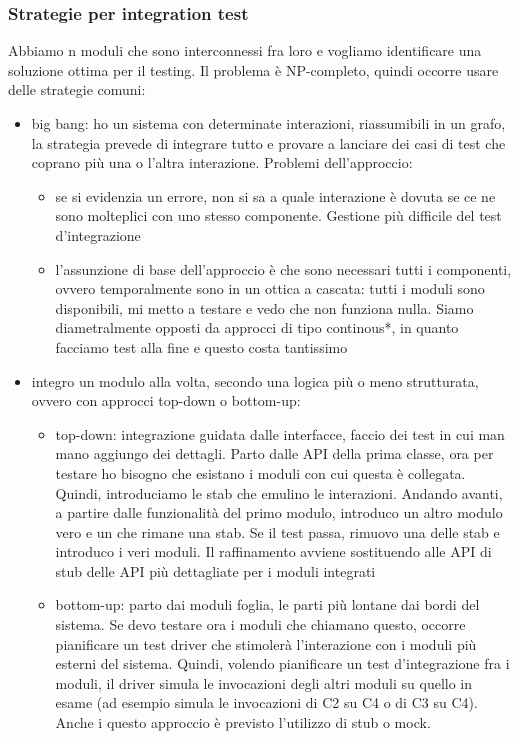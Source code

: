 \documentclass{article}
\begin{document}
\subsubsection{Strategie per integration test}
Abbiamo n moduli che sono interconnessi fra loro e vogliamo identificare una soluzione ottima per il testing. Il problema è NP-completo, quindi occorre usare delle strategie comuni:
\begin{itemize}
\item big bang: ho un sistema con determinate interazioni, riassumibili in un grafo, la strategia prevede di integrare tutto e provare a lanciare dei casi di test che coprano più una o l'altra interazione. Problemi dell'approccio:
\begin{itemize}
\item se si evidenzia un errore, non si sa a quale interazione è dovuta se ce ne sono molteplici con uno stesso componente. Gestione più difficile del test d'integrazione
\item l'assunzione di base dell'approccio è che sono necessari tutti i componenti, ovvero temporalmente sono in un ottica a cascata: tutti i moduli sono disponibili, mi metto a testare e vedo che non funziona nulla. Siamo diametralmente opposti da approcci di tipo continous*, in quanto facciamo test alla fine e questo costa tantissimo
\end{itemize}
\item integro un modulo alla volta, secondo una logica più o meno strutturata, ovvero con approcci top-down o bottom-up:
\begin{itemize}
\item top-down: integrazione guidata dalle interfacce, faccio dei test in cui man mano aggiungo dei dettagli. Parto dalle API della prima classe, ora per testare ho bisogno che esistano i moduli con cui questa è collegata. Quindi, introduciamo le stab che emulino le interazioni. Andando avanti, a partire dalle funzionalità del primo modulo, introduco un altro modulo vero e un che rimane una stab. Se il test passa, rimuovo una delle stab e introduco i veri moduli. Il raffinamento avviene sostituendo alle API di stub delle API più dettagliate per i moduli integrati
\item bottom-up: parto dai moduli foglia, le parti più lontane dai bordi del sistema. Se devo testare ora i moduli che chiamano questo, occorre pianificare un test driver che stimolerà l'interazione con i moduli più esterni del sistema. Quindi, volendo pianificare un test d'integrazione fra i moduli, il driver simula le invocazioni degli altri moduli su quello in esame (ad esempio simula le invocazioni di C2 su C4 o di C3 su C4). Anche i questo approccio è previsto l'utilizzo di stub o mock.
\end{itemize}
\end{itemize}
\end{document}
